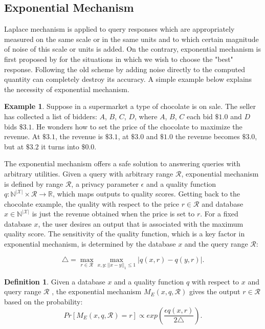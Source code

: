 \documentclass[a4paper, 11pt]{article} %
\theoremstyle{definition}
\newtheorem{definition}{Definition}[section]
\newtheorem{example}{Example}[section]
\begin{document}
\subsection{Exponential Mechanism}
Laplace mechanism is applied to query responses which are appropriately measured on the same scale or in the same units and to which certain magnitude of noise of this scale or units is added. On the contrary, exponential mechanism is first proposed by \cite{mcsherry2007mechanism} for the situations  in which we wish to choose the "best" response. Following the old scheme by adding noise directly to the computed quantity can completely destroy its accuracy. A simple example below explains the necessity of exponential mechanism.

\begin{example}
Suppose in a supermarket a type of chocolate is on sale. The seller has collected a list of bidders: $A$, $B$, $C$, $D$, where $A$, $B$, $C$ each bid $\$1.0$ and $D$ bids $\$3.1$. He wonders how to set the price of the chocolate to maximize the revenue. At $\$3.1$, the revenue is $\$3.1$, at $\$3.0$ and $\$1.0$ the revenue becomes $\$3.0$, but at $\$3.2$ it turns into $\$0.0$.
\end{example}

The exponential mechanism offers a safe solution to answering queries with arbitrary utilities. Given a query with arbitrary range $\mathcal{R}$, exponential mechanism is defined by range $\mathcal{R}$, a privacy parameter $\epsilon$ and a quality function $q: \mathbb{N}^{|\mathcal{X}|} \times \mathcal{R} \rightarrow \mathbb{R}$, which maps outputs to quality scores. Getting back to the chocolate example, the quality with respect to the price $r\in \mathcal{R}$ and database $x \in  \mathbb{N}^{|\mathcal{X}|}$ is just the revenue obtained when the price is set to $r$. For a fixed database $x$, the user desires an output that is associated with the maximum quality score. The sensitivity of the quality function, which is a key factor in exponential mechanism, is determined by the database $x$ and the query range $\mathcal{R}$:

\begin{equation}
\triangle = \max_{r \in \mathcal{R}} \max_{x,y:||x-y||_1 \leq 1} |q(x, r)-q(y,r)|.
\end{equation}

\begin{definition} 
Given a database $x$ and a quality function $q$ with respect to $x$ and query range $\mathcal{R}$ , the exponential mechanism $M_E(x, q, \mathcal{R})$ gives the output $r \in \mathcal{R}$ based on the probability:
$$Pr[M_E(x, q, \mathcal{R}) = r] \propto exp(\frac{\epsilon q(x, r)}{2\triangle}).$$
\end{definition}
\end{document}
